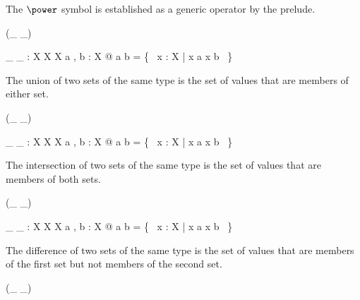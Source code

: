 \documentclass[draft,a4paper,10pt,wd]{isov2}
\begin{document}
\begin{note}
The $\power$ symbol is established as a generic operator by the prelude.
\end{note}


\begin{zed}
 \leftassoc (\_ \cup \_)
\end{zed}

\begin{gendef}[X]
\_ \cup \_ : \power X \cross \power X \fun \power X
\where
\forall a , b : \power X @ a \cup b = \{~ x : X | x \in a \lor x \in b ~\}
\end{gendef}

The union of two sets of the same type is the set of values
that are members of either set.


\begin{zed}
 \leftassoc (\_ \cap \_)
\end{zed}

\begin{gendef}[X]
\_ \cap \_ : \power X \cross \power X \fun \power X
\where
\forall a , b : \power X @ a \cap b = \{~ x : X | x \in a \land x \in b ~\}
\end{gendef}

The intersection of two sets of the same type is the set of
values that are members of both sets.


\begin{zed}
 \leftassoc (\_ \setminus \_)
\end{zed}

\begin{gendef}[X]
\_ \setminus \_ : \power X \cross \power X \fun \power X
\where
\forall a , b : \power X @ a \setminus b = \{~ x : X | x \in a \land x \notin b ~\}
\end{gendef}

The difference of two sets of the same type is the set of
values that are members of the first set but not members of the second set.


\begin{zed}
 \leftassoc (\_ \symdiff \_)
\end{zed}
\end{document}
